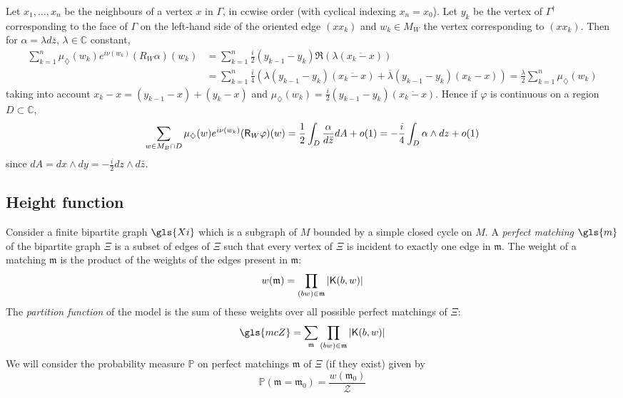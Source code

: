 \documentclass[10pt]{article}
\newcommand{\C}{\mathbb{C}}
\renewcommand{\P}{\mathbb{P}}
\newcommand{\rK}{{\sf K}}
\newcommand{\rR}{{\sf R}}
\newcommand{\dg}{\dagger}
\newcommand{\dmd}{\diamondsuit}
\newcommand{\mfm}{{\mathfrak m}}
\begin{document}
Let $x_1,\dots,x_n$ be the neighbours of a vertex $x$ in $\Gamma$, in ccwise order (with cyclical indexing $x_n=x_0$). Let $y_k$ be the vertex of $\Gamma^\dg$ corresponding to the face of $\Gamma$ on the left-hand side of the oriented edge $(xx_k)$ and $w_k\in M_W$ the vertex corresponding to $(xx_k)$. Then for $\alpha=\lambda d\bar z$, $\lambda\in\C$ constant,
\begin{align*}
\sum_{k=1}^n\mu_\dmd(w_k)e^{i\nu(w_k)}(R_W\alpha)(w_k)&=\sum_{k=1}^n\frac i2(y_{k-1}-y_{k})\Re(\lambda(\overline{x_k-x}))\\
&=\sum_{k=1}^n\frac i4\left(\lambda (y_{k-1}-y_{k})(\overline{x_{k}-x})+\overline\lambda (y_{k-1}-y_{k})(x_k-x)\right)=\frac\lambda 2\sum_{k=1}^n\mu_\dmd(w_k)
\end{align*}
taking into account $x_k-x=(y_{k-1}-x)+(y_k-x)$ and $\mu_\dmd(w_k)=\frac i2(y_{k-1}-y_k)(\overline {x_k-x})$. Hence if $\varphi$ is continuous on a region $D\subset\C$, 
\begin{equation}\label{eq:int}
\sum_{w\in M_B\cap D}\mu_\dmd(w)e^{i\nu(w_k)}(\rR_W\varphi)(w)=\frac 12\int_D\frac{\alpha}{d\bar z} dA+o(1)=-\frac i4\int_D\alpha\wedge dz+o(1)
\end{equation}
since $dA=dx\wedge dy=-\frac i2 dz\wedge d\bar z$. 








\subsection{Height function}\label{ss:height}

Consider a finite bipartite graph $\gls{Xi}$ which is a subgraph of $M$ bounded by a simple closed cycle on $M$. 
%
A {\em perfect matching} $\gls{m}$ of the bipartite graph $\Xi$ is a subset of edges of $\Xi$ such that every vertex of $\Xi$ is incident to exactly one edge in $\mfm$. The weight of a matching $\mfm$ is the product of the weights of the edges present in ${\mfm}$:
$$w(\mfm)=\prod_{(bw)\in\mfm}|\rK(b,w)|$$
The {\em partition function} of the model is the sum of these weights over all possible perfect matchings of $\Xi$:
\begin{equation}\label{eq:dimerpartfun}
\gls{mcZ}=\sum_{\mfm}\prod_{(bw)\in\mfm}|\rK(b,w)|
\end{equation}
We will consider the probability measure $\P$ on perfect matchings $\mfm$ of $\Xi$ (if they exist) given by 
$$\P(\mfm=\mfm_0)=\frac{w(\mfm_0)}{{\mathcal Z}}$$
\end{document}
